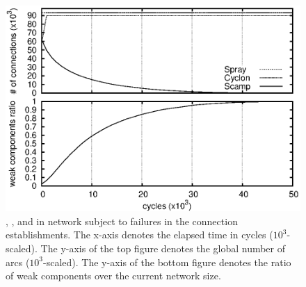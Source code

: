 \begin{figure}
  \centering \includegraphics[width=\textwidth]{img/spray/degen.eps}
  \caption{\label{fig:degeneration}\CYCLON, \SCAMP, and \SPRAY in network
    subject to failures in the connection establishments. The x-axis denotes
    the elapsed time in cycles ($10^3$-scaled). The y-axis of the top figure
    denotes the global number of arcs ($10^3$-scaled). The y-axis of the bottom
    figure denotes the ratio of weak components over the current network size.}
\end{figure}

